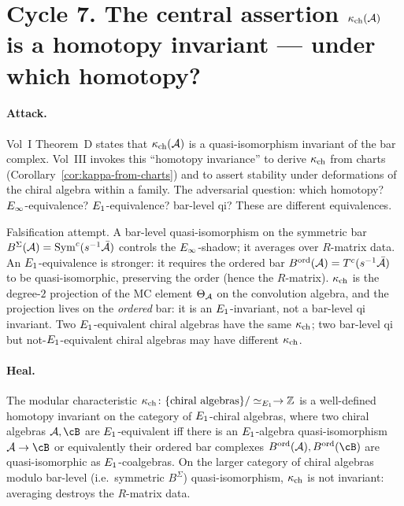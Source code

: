 \section*{Cycle 7. The central assertion $\kappa_{\mathrm{ch}}(\mathcal{A})$ is a
  homotopy invariant --- under which homotopy?}

\paragraph{Attack.} Vol~I Theorem~D states that $\kappa_{\mathrm{ch}}(\mathcal{A})$ is a
quasi-isomorphism invariant of the bar complex. Vol~III invokes
this ``homotopy invariance'' to derive $\kappa_{\mathrm{ch}}$ from charts
(Corollary~\ref{cor:kappa-from-charts}) and to assert stability
under deformations of the chiral algebra within a family. The
adversarial question: which homotopy?  $E_\infty$-equivalence?
$E_1$-equivalence? bar-level qi?  These are different
equivalences.

Falsification attempt. A bar-level quasi-isomorphism on the
symmetric bar $B^\Sigma(\mathcal{A}) = \mathrm{Sym}^c(s^{-1}\bar{\mathcal{A}})$ controls
the $E_\infty$-shadow; it averages over $R$-matrix data. An
$E_1$-equivalence is stronger: it requires the ordered bar
$B^{\mathrm{ord}}(\mathcal{A}) = T^c(s^{-1}\bar{\mathcal{A}})$ to be quasi-isomorphic,
preserving the order (hence the $R$-matrix). $\kappa_{\mathrm{ch}}$ is the
degree-$2$ projection of the MC element $\Theta_{\mathcal{A}}$ on the
convolution algebra, and the projection lives on the
\emph{ordered} bar: it is an $E_1$-invariant, not a bar-level
qi invariant.  Two $E_1$-equivalent chiral algebras have the
same $\kappa_{\mathrm{ch}}$; two bar-level qi but not-$E_1$-equivalent chiral
algebras may have different $\kappa_{\mathrm{ch}}$.

\paragraph{Heal.}

\begin{theorem}
\label{thm:gelfand-kappa-invariance}
\ClaimStatusDerivation{}
The modular characteristic $\kappa_{\mathrm{ch}} \colon \{\text{chiral algebras}\}/\simeq_{E_1} \to \mathbb{Z}$
is a well-defined homotopy invariant on the category of
$E_1$-chiral algebras, where two chiral algebras $\cA, \cB$
are $E_1$-equivalent iff there is an $E_1$-algebra
quasi-isomorphism $\cA \to \cB$ or equivalently their ordered
bar complexes $B^{\mathrm{ord}}(\cA), B^{\mathrm{ord}}(\cB)$ are
quasi-isomorphic as $E_1$-coalgebras. On the larger category of
chiral algebras modulo bar-level (i.e.\ symmetric
$B^\Sigma$) quasi-isomorphism, $\kappa_{\mathrm{ch}}$ is not invariant:
averaging destroys the $R$-matrix data.
\end{theorem}

